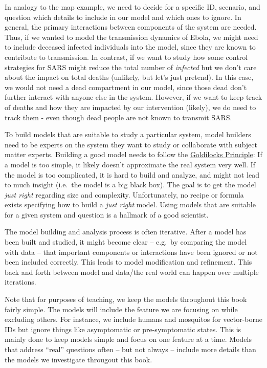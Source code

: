 \documentclass[
]{book}
\begin{document}
In analogy to the map example, we need to decide for a specific ID, scenario, and question which details to include in our model and which ones to ignore. In general, the primary interactions between components of the system are needed. Thus, if we wanted to model the transmission dynamics of Ebola, we might need to include deceased infected individuals into the model, since they are known to contribute to transmission. In contrast, if we want to study how some control strategies for SARS might reduce the total number of \emph{infected} but we don't care about the impact on total deaths (unlikely, but let's just pretend). In this case, we would not need a dead compartment in our model, since those dead don't further interact with anyone else in the system. However, if we want to keep track of deaths and how they are impacted by our intervention (likely), we do need to track them - even though dead people are not known to transmit SARS.

To build models that are suitable to study a particular system, model builders need to be experts on the system they want to study or collaborate with subject matter experts. Building a good model needs to follow the \href{https://en.wikipedia.org/wiki/Goldilocks_principle}{Goldilocks Principle}: If a model is too simple, it likely doesn't approximate the real system very well. If the model is too complicated, it is hard to build and analyze, and might not lead to much insight (i.e.~the model is a big black box). The goal is to get the model \emph{just right} regarding size and complexity. Unfortunately, no recipe or formula exists specifying how to build a \emph{just right} model. Using models that are suitable for a given system and question is a hallmark of a good scientist.

The model building and analysis process is often iterative. After a model has been built and studied, it might become clear -- e.g.~by comparing the model with data -- that important components or interactions have been ignored or not been included correctly. This leads to model modification and refinement. This back and forth between model and data/the real world can happen over multiple iterations.

Note that for purposes of teaching, we keep the models throughout this book fairly simple. The models will include the feature we are focusing on while excluding others. For instance, we include humans and mosquitos for vector-borne IDs but ignore things like asymptomatic or pre-symptomatic states. This is mainly done to keep models simple and focus on one feature at a time. Models that address ``real'' questions often -- but not always -- include more details than the models we investigate througout this book.
\end{document}
